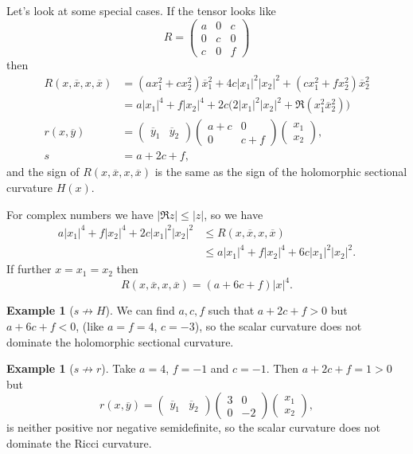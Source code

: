 \documentclass[10pt,a4paper]{amsart}
\theoremstyle{definition}
\newtheorem{exam}[theo]{Example}
\def\ov#1{\overline{#1}}
\begin{document}
Let's look at some special cases. If the tensor looks like
$$
R =
\begin{pmatrix}
a & 0 & c
\\
0 & c & 0
\\
c & 0 & f
\end{pmatrix}
$$
then
\begin{align*}
R(x, \ov x, x, \ov x)
&= (a x_1^2 + c x_2^2) \ov x_1^2
+ 4 c |x_1|^2 |x_2|^2
+ (c x_1^2 + f x_2^2) \ov x_2^2
\\
&= a |x_1|^4 + f |x_2|^4
+ 2 c \bigl(2 |x_1|^2 |x_2|^2 + \Re(x_1^2 \ov x_2^2) \bigr)
\\
r(x, \ov y)
&=
\begin{pmatrix}\ov y_1 & \ov y_2 \end{pmatrix}
\begin{pmatrix}
a + c & 0 \\ 0 & c + f
\end{pmatrix}
\begin{pmatrix} x_1 \\ x_2 \end{pmatrix},
\\
s &= a + 2c + f,
\end{align*}
and the sign of $R(x, \ov x, x, \ov x)$ is the same as the sign of the
holomorphic sectional curvature $H(x)$.

For complex numbers we have $|\Re z| \leq |z|$, so we have
\begin{align*}
a |x_1|^4 + f |x_2|^4 + 2c |x_1|^2 |x_2|^2
&\leq R(x, \ov x, x, \ov x)
\\
&\leq a |x_1|^4 + f |x_2|^4 + 6c |x_1|^2 |x_2|^2.
\end{align*}
If further $x = x_1 = x_2$ then
$$
R(x, \ov x, x, \ov x)
= (a + 6c + f) |x|^4.
$$

\begin{exam}[$s \not\to H$]
We can find $a, c, f$ such that $a + 2c + f > 0$ but $a + 6c + f < 0$,
(like $a = f = 4$, $c = -3$), so the scalar curvature does not dominate
the holomorphic sectional curvature.
\end{exam}

\begin{exam}[$s \not\to r$]
Take $a = 4$, $f = -1$ and $c = -1$. Then $a + 2c + f = 1 > 0$ but
$$
r(x, \ov y) =
\begin{pmatrix}\ov y_1 & \ov y_2 \end{pmatrix}
\begin{pmatrix}
3 & 0 \\ 0 & -2
\end{pmatrix}
\begin{pmatrix} x_1 \\ x_2 \end{pmatrix},
$$
is neither positive nor negative semidefinite, so the scalar curvature
does not dominate the Ricci curvature.
\end{exam}
\end{document}
